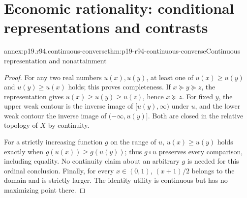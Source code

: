 \section{Economic rationality: conditional representations and contrasts}
\label{sec:p19-annex-rationality-9-4}

\begin{annexitem}{annex:p19.r94.continuous-converse}{thm:p19-r94-continuous-converse}{Continuous representation and nonattainment}
\begin{proof}
For any two real numbers \(u(x),u(y)\), at least one of
\(u(x)\geq u(y)\) and \(u(y)\geq u(x)\) holds; this proves
completeness. If \(x\succeq y\succeq z\), the representation gives
\(u(x)\geq u(y)\geq u(z)\), hence \(x\succeq z\).
For fixed \(y\), the upper weak contour is the inverse image of
\([u(y),\infty)\) under \(u\), and the lower weak contour the
inverse image of \(( -\infty,u(y)]\). Both are closed in the relative
topology of \(X\) by continuity.

For a strictly increasing function \(g\) on the range of \(u\),
\(u(x)\geq u(y)\) holds exactly when
\(g(u(x))\geq g(u(y))\); thus \(g\circ u\) preserves every
comparison, including equality. No continuity claim about an arbitrary
\(g\) is needed for this ordinal conclusion.
Finally, for every \(x\in(0,1)\), \((x+1)/2\) belongs to the domain
and is strictly larger. The identity utility is continuous but has no
maximizing point there.
\end{proof}
\end{annexitem}

